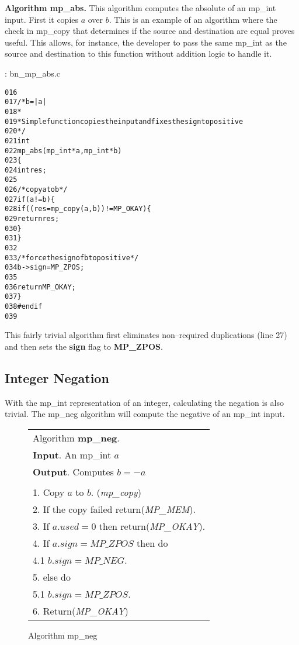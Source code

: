 \documentclass[b5paper]{book}
\begin{document}
\textbf{Algorithm mp\_abs.}
This algorithm computes the absolute of an mp\_int input.  First it copies $a$ over $b$.  This is an example of an
algorithm where the check in mp\_copy that determines if the source and destination are equal proves useful.  This allows,
for instance, the developer to pass the same mp\_int as the source and destination to this function without addition 
logic to handle it.

\vspace{+3mm}\begin{small}
\hspace{-5.1mm}{\bf File}: bn\_mp\_abs.c
\vspace{-3mm}
\begin{alltt}
016   
017   /* b = |a| 
018    *
019    * Simple function copies the input and fixes the sign to positive
020    */
021   int
022   mp_abs (mp_int * a, mp_int * b)
023   \{
024     int     res;
025   
026     /* copy a to b */
027     if (a != b) \{
028        if ((res = mp_copy (a, b)) != MP_OKAY) \{
029          return res;
030        \}
031     \}
032   
033     /* force the sign of b to positive */
034     b->sign = MP_ZPOS;
035   
036     return MP_OKAY;
037   \}
038   #endif
039   
\end{alltt}
\end{small}

This fairly trivial algorithm first eliminates non--required duplications (line 27) and then sets the
\textbf{sign} flag to \textbf{MP\_ZPOS}.

\subsection{Integer Negation}
With the mp\_int representation of an integer, calculating the negation is also trivial.  The mp\_neg algorithm will compute
the negative of an mp\_int input.

\begin{figure}[here]
\begin{center}
\begin{tabular}{l}
\hline Algorithm \textbf{mp\_neg}. \\
\textbf{Input}.   An mp\_int $a$ \\
\textbf{Output}.  Computes $b = -a$ \\
\hline \\
1.  Copy $a$ to $b$.  (\textit{mp\_copy}) \\
2.  If the copy failed return(\textit{MP\_MEM}). \\
3.  If $a.used = 0$ then return(\textit{MP\_OKAY}). \\
4.  If $a.sign = MP\_ZPOS$ then do \\
\hspace{3mm}4.1  $b.sign = MP\_NEG$. \\
5.  else do \\
\hspace{3mm}5.1  $b.sign = MP\_ZPOS$. \\
6.  Return(\textit{MP\_OKAY}) \\
\hline
\end{tabular}
\end{center}
\caption{Algorithm mp\_neg}
\end{figure}
\end{document}
